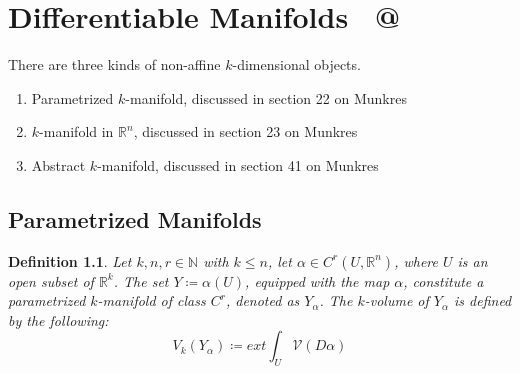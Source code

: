 \documentclass[15pt]{book}
\makeatletter
\theoremstyle{break}
\theoremstyle{break}
\newtheorem{defn}{Definition}[corL]
\newcommand{\R}{\mathbb{R}}
\newcommand{\N}{\mathbb{N}}
\newcommand*{\rom}[1]{\expandafter\@slowromancap\romannumeral #1@}
\makeatother
\begin{document}
\newpage
\chapter{Differentiable Manifolds \ \rom{1}}
\setcounter{section}{14}
There are three kinds of non-affine $k$-dimensional objects. 
\begin{enumerate}[topsep=3pt,itemsep=-1ex,partopsep=1ex,parsep=1ex]
\item Parametrized $k$-manifold, discussed in section 22 on Munkres
\item $k$-manifold in $\R^n$, discussed in section 23 on Munkres
\item Abstract $k$-manifold, discussed in section 41 on Munkres
\end{enumerate} 

\section[Parametrized Manifolds]{\color{red} Parametrized Manifolds \color{black}}

\begin{defn}
Let $k,n,r\in \N$ with $k \leq n$, let $\alpha \in C^r(U, \R^n)$, where $U$ is an open subset of $\R^k$.  The set $Y \coloneqq \alpha(U)$, equipped with the map $\alpha$, constitute a parametrized $k$-manifold of class $C^r$, denoted as $Y_\alpha$. The $k$-volume of $Y_\alpha$ is defined by the following:
$$V_k(Y_\alpha) \coloneqq ext \int_U \mathcal{V}(D\alpha)$$
\end{defn}
\end{document}
